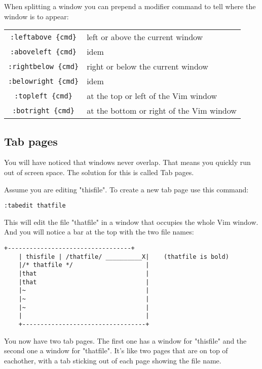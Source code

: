 When splitting a window you can prepend a modifier command to tell where the window is to appear:
\begin{center}
				\begin{longtable}{c l}
								\verb!:leftabove {cmd}! & left or above the current window \\
								\verb!:aboveleft {cmd}! & idem \\
								\verb!:rightbelow {cmd}! & right or below the current window \\
								\verb!:belowright {cmd}! & idem \\
								\verb!:topleft {cmd}! & at the top or left of the Vim window \\
								\verb!:botright {cmd}! & at the bottom or right of the Vim window \\
				\end{longtable}
\end{center}
\subsection{Tab pages}
You will have noticed that windows never overlap.
That means you quickly run out of screen space.
The solution for this is called Tab pages.

Assume you are editing "thisfile".
To create a new tab page use this command:

 \begin{Verbatim}[samepage=true]
 :tabedit thatfile
 \end{Verbatim}

This will edit the file "thatfile" in a window that occupies the whole Vim window.
And you will notice a bar at the top with the two file names:

		\begin{Verbatim}[samepage=true]
    +----------------------------------+
    | thisfile | /thatfile/ __________X|    (thatfile is bold)
    |/* thatfile */                    |
    |that                              |
    |that                              |
    |~                                 |
    |~                                 |
    |~                                 |
    |                                  |
    +----------------------------------+
						\end{Verbatim}

You now have two tab pages.
The first one has a window for "thisfile" and the second one a window for "thatfile".
It's like two pages that are on top of eachother, with a tab sticking out of each page showing the file name.


